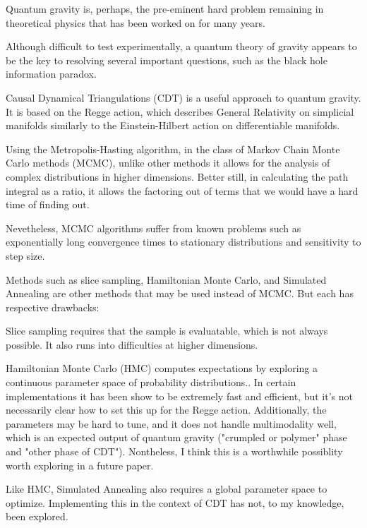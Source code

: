 \documentclass[12pt]{article}
\begin{document}
Quantum gravity is, perhaps, the pre-eminent hard problem\cite{steve_carlip_why_2014} remaining in theoretical physics that has been worked on for many years\cite{rovelli_notes_2000}.

Although difficult to test experimentally, a quantum theory of gravity appears to be the key to resolving several important
questions, such as the black hole information paradox.

Causal Dynamical Triangulations (CDT) \cite{j._ambjorn_dynamically_2001} is a useful approach to
quantum gravity. It is based on the Regge action\cite{regge_general_1961}, which describes General Relativity on simplicial manifolds similarly to the Einstein-Hilbert action on differentiable manifolds.

Using the Metropolis-Hasting algorithm, in the class of Markov Chain Monte Carlo methods (MCMC), unlike other methods it allows
for the analysis of complex distributions in higher dimensions. Better still, in calculating the path integral as a ratio, it allows
the factoring out of terms that we would have a hard time of finding out.

Nevetheless, MCMC algorithms suffer from known problems such as exponentially long convergence times to stationary distributions and sensitivity to step size.

Methods such as slice sampling, Hamiltonian Monte Carlo, and Simulated Annealing are other methods that may be used instead of MCMC.
But each has respective drawbacks:

Slice sampling requires that the sample is evaluatable, which is not always possible. It also runs into difficulties at higher dimensions.

Hamiltonian Monte Carlo (HMC) computes expectations by exploring a continuous parameter space of probability distributions.\cite{betancourt_conceptual_2017}. In certain implementations
it has been show to be extremely fast and efficient\cite{hoffman_no-u-turn_2011}, but it's not necessarily clear how to set this up for the Regge action. Additionally, the parameters may be hard to tune, and it does not handle multimodality well, which is an expected output of quantum gravity ("crumpled or polymer" phase and "other phase of CDT"). Nontheless, I think this is a worthwhile possiblity worth exploring in a future paper.

Like HMC, Simulated Annealing also requires a global parameter space to optimize.\cite{busetti_simulated_nodate} Implementing this in the context of CDT has not, to my knowledge, been explored.
\end{document}
